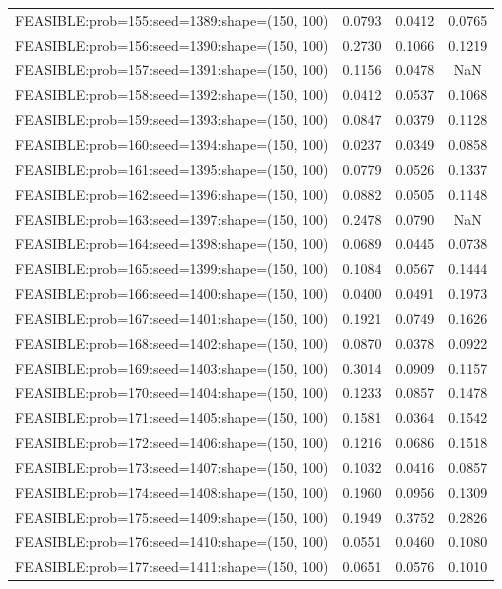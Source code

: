 \begin{longtable}{lccc}
FEASIBLE:prob=155:seed=1389:shape=(150, 100) & 0.0793 & 0.0412 & 0.0765 \\
FEASIBLE:prob=156:seed=1390:shape=(150, 100) & 0.2730 & 0.1066 & 0.1219 \\
FEASIBLE:prob=157:seed=1391:shape=(150, 100) & 0.1156 & 0.0478 &    NaN \\
FEASIBLE:prob=158:seed=1392:shape=(150, 100) & 0.0412 & 0.0537 & 0.1068 \\
FEASIBLE:prob=159:seed=1393:shape=(150, 100) & 0.0847 & 0.0379 & 0.1128 \\
FEASIBLE:prob=160:seed=1394:shape=(150, 100) & 0.0237 & 0.0349 & 0.0858 \\
FEASIBLE:prob=161:seed=1395:shape=(150, 100) & 0.0779 & 0.0526 & 0.1337 \\
FEASIBLE:prob=162:seed=1396:shape=(150, 100) & 0.0882 & 0.0505 & 0.1148 \\
FEASIBLE:prob=163:seed=1397:shape=(150, 100) & 0.2478 & 0.0790 &    NaN \\
FEASIBLE:prob=164:seed=1398:shape=(150, 100) & 0.0689 & 0.0445 & 0.0738 \\
FEASIBLE:prob=165:seed=1399:shape=(150, 100) & 0.1084 & 0.0567 & 0.1444 \\
FEASIBLE:prob=166:seed=1400:shape=(150, 100) & 0.0400 & 0.0491 & 0.1973 \\
FEASIBLE:prob=167:seed=1401:shape=(150, 100) & 0.1921 & 0.0749 & 0.1626 \\
FEASIBLE:prob=168:seed=1402:shape=(150, 100) & 0.0870 & 0.0378 & 0.0922 \\
FEASIBLE:prob=169:seed=1403:shape=(150, 100) & 0.3014 & 0.0909 & 0.1157 \\
FEASIBLE:prob=170:seed=1404:shape=(150, 100) & 0.1233 & 0.0857 & 0.1478 \\
FEASIBLE:prob=171:seed=1405:shape=(150, 100) & 0.1581 & 0.0364 & 0.1542 \\
FEASIBLE:prob=172:seed=1406:shape=(150, 100) & 0.1216 & 0.0686 & 0.1518 \\
FEASIBLE:prob=173:seed=1407:shape=(150, 100) & 0.1032 & 0.0416 & 0.0857 \\
FEASIBLE:prob=174:seed=1408:shape=(150, 100) & 0.1960 & 0.0956 & 0.1309 \\
FEASIBLE:prob=175:seed=1409:shape=(150, 100) & 0.1949 & 0.3752 & 0.2826 \\
FEASIBLE:prob=176:seed=1410:shape=(150, 100) & 0.0551 & 0.0460 & 0.1080 \\
FEASIBLE:prob=177:seed=1411:shape=(150, 100) & 0.0651 & 0.0576 & 0.1010 \\

\end{longtable}
